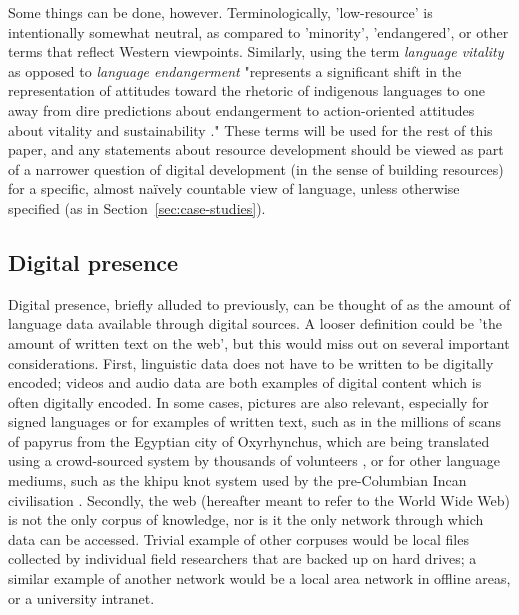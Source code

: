 Some things can be done, however. Terminologically, 'low-resource' is intentionally somewhat neutral, as compared to 'minority', 'endangered', or other terms that reflect Western viewpoints. Similarly, using the term {\it language vitality} as opposed to {\it language endangerment} "represents a significant shift in the representation of attitudes toward the rhetoric of indigenous languages to one away from dire predictions about endangerment to action-oriented attitudes about vitality and sustainability \citep{grenoble2016response}." These terms will be used for the rest of this paper, and any statements about resource development should be viewed as part of a narrower question of digital development (in the sense of building resources) for a specific, almost na\"ively countable view of language, unless otherwise specified (as in Section~\ref{sec:case-studies}).

\subsection{Digital presence}


Digital presence, briefly alluded to previously, can be thought of as the amount of language data available through digital sources. A looser definition could be 'the amount of written text on the web', but this would miss out on several important considerations. First, linguistic data does not have to be written to be digitally encoded; videos and audio data are both examples of digital content which is often digitally encoded. In some cases, pictures are also relevant, especially for signed languages or for examples of written text, such as in the millions of scans of papyrus from the Egyptian city of Oxyrhynchus, which are being translated using a crowd-sourced system by thousands of volunteers \citep{williams2014computational}, or for other language mediums, such as the khipu knot system used by the pre-Columbian Incan civilisation \citep{quilter2002narrative}. Secondly, the web (hereafter meant to refer to the World Wide Web) is not the only corpus of knowledge, nor is it the only network through which data can be accessed. Trivial example of other corpuses would be local files collected by individual field researchers that are backed up on hard drives; a similar example of another network would be a local area network in offline areas, or a university intranet.

